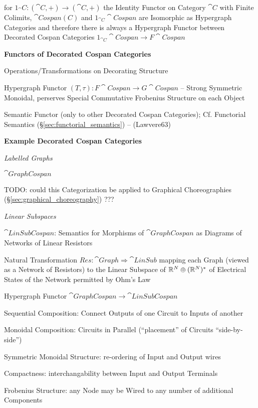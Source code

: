 for $1_\cat{C} : (\cat{C}, +) \rightarrow (\cat{C}, +)$ the Identity
Functor on Category $\cat{C}$ with Finite Colimits, $\cat{Cospan(C)}$
and $1_{\cat{C}}\cat{Cospan}$ are Isomorphic as Hypergraph Categories
and therefore there is always a Hypergraph Functor between Decorated
Cospan Categories $1_{\cat{C}}\cat{Cospan} \rightarrow F\cat{Cospan}$


\textbf{Functors of Decorated Cospan Categories}


Operations/Transformations on Decorating Structure

Hypergraph Functor $(T,\tau) : F\cat{Cospan} \rightarrow
G\cat{Cospan}$ -- Strong Symmetric Monoidal, perserves Special
Commutative Frobenius Structure on each Object

Semantic Functor (only to other Decorated Cospan Categories); \fist
Cf. Functorial Semantics (\S\ref{sec:functorial_semantics}) --
(Lawvere63)


\textbf{Example Decorated Cospan Categories}


\emph{Labelled Graphs}

$\cat{GraphCospan}$

TODO: could this Categorization be applied to Graphical Choreographies
(\S\ref{sec:graphical_choreography}) ???


\emph{Linear Subspaces}

$\cat{LinSubCospan}$: Semantics for Morphisms of $\cat{GraphCospan}$
as Diagrams of Networks of Linear Resistors

Natural Transformation $Res : \cat{Graph} \Rightarrow \cat{LinSub}$
mapping each Graph (viewed as a Network of Resistors) to the Linear
Subspace of $\mathbb{R}^N \oplus (\mathbb{R}^N)^*$ of Electrical States of the
Network permitted by Ohm's Law

Hypergraph Functor $\cat{GraphCospan} \rightarrow \cat{LinSubCospan}$

Sequential Composition: Connect Outputs of one Circuit to Inputs of
another

Monoidal Composition: Circuits in Parallel (``placement'' of Circuits
``side-by-side'')

Symmetric Monoidal Structure: re-ordering of Input and Output wires

Compactness: interchangability between Input and Output Terminals

Frobenius Structure: any Node may be Wired to any number of additional
Components



